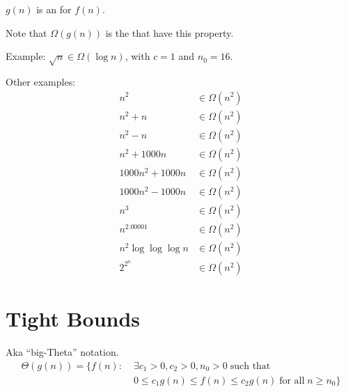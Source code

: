 \documentclass[a4paper]{report}
\newcommand{\bookref}[3]{\marginpar{\faBook{}~#1\\Chapter #2\\Section #3}}
\theoremstyle{definition}
\begin{document}
$g(n)$ is an  for $f(n)$.

Note that $\Omega(g(n))$ is the  that have this property.

Example: $\sqrt{n} \in \Omega(\log n)$, with $c = 1$ and $n_0 = 16$.
\begin{center}
\end{center}

Other examples:
\begin{align*}
n^2 &\in \Omega(n^2)\\
n^2+n &\in \Omega(n^2)\\
n^2-n &\in \Omega(n^2)\\
n^2+1000n &\in \Omega(n^2)\\
1000n^2+1000n &\in \Omega(n^2)\\
1000n^2-1000n &\in \Omega(n^2)\\
n^3 &\in \Omega(n^2)\\
n^{2.00001} &\in \Omega(n^2)\\
n^2\log{\log{\log n}} &\in \Omega(n^2)\\
2^{2^n} &\in \Omega(n^2)
\end{align*}

\section{Tight Bounds}
\bookref{CLRS}{3}{3.1}
Aka ``big-Theta'' notation.
\begin{align*}
\Theta(g(n)) = \{ f(n) : &\;\exists c_1 > 0, c_2 > 0, n_0 > 0 \;\text{such that}\\ &\; 0 \leq c_1g(n) \leq f(n) \leq c_2g(n) \;\text{for all}\; n \geq n_0\}
\end{align*}
\end{document}
